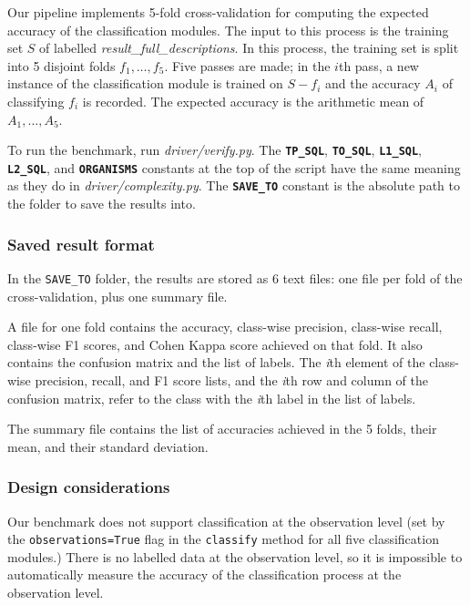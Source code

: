 \documentclass[a4paper]{article}
\begin{document}
Our pipeline implements 5-fold cross-validation for computing the expected accuracy of the classification modules. The input to this process is the training set $S$ of labelled \textit{result\_full\_descriptions}. In this process, the training set is split into 5 disjoint folds $f_1, \ldots, f_5$. Five passes are made; in the $i$th pass, a new instance of the classification module is trained on $S - f_i$ and the accuracy $A_i$ of classifying $f_i$ is recorded. The expected accuracy is the arithmetic mean of $A_1, \ldots, A_5$.

To run the benchmark, run \textit{driver/verify.py}. The \textbf{\lstinline{TP_SQL}}, \textbf{\lstinline{TO_SQL}}, \textbf{\lstinline{L1_SQL}}, \textbf{\lstinline{L2_SQL}}, and \textbf{\lstinline{ORGANISMS}} constants at the top of the script have the same meaning as they do in \textit{driver/complexity.py}. The \textbf{\lstinline{SAVE_TO}} constant is the absolute path to the folder to save the results into.

\subsubsection{Saved result format}

In the \lstinline{SAVE_TO} folder, the results are stored as 6 text files: one file per fold of the cross-validation, plus one summary file.

A file for one fold contains the accuracy, class-wise precision, class-wise recall, class-wise F1 scores, and Cohen Kappa score achieved on that fold. It also contains the confusion matrix and the list of labels. The \textit{i}th element of the class-wise precision, recall, and F1 score lists, and the \textit{i}th row and column of the confusion matrix, refer to the class with the \textit{i}th label in the list of labels.

The summary file contains the list of accuracies achieved in the 5 folds, their mean, and their standard deviation.

\subsubsection{Design considerations}

Our benchmark does not support classification at the observation level (set by the \lstinline{observations=True} flag in the \lstinline{classify} method for all five classification modules.) There is no labelled data at the observation level, so it is impossible to automatically measure the accuracy of the classification process at the observation level.
\end{document}
